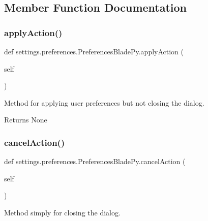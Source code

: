 \subsection{Member Function Documentation}
\hypertarget{classsettings_1_1preferences_1_1_preferences_blade_py_a8938a7b43ca7c5496a0ae7bf8d6a0c54}{}\label{classsettings_1_1preferences_1_1_preferences_blade_py_a8938a7b43ca7c5496a0ae7bf8d6a0c54} 
\subsubsection{\texorpdfstring{apply\+Action()}{applyAction()}}
{\footnotesize\ttfamily def settings.\+preferences.\+Preferences\+Blade\+Py.\+apply\+Action (\begin{DoxyParamCaption}\item[{}]{self }\end{DoxyParamCaption})}



Method for applying user preferences but not closing the dialog. 

\begin{DoxyReturn}{Returns}
None 
\end{DoxyReturn}
\hypertarget{classsettings_1_1preferences_1_1_preferences_blade_py_af92de31fcc110a9892dc2914efb6b46f}{}\label{classsettings_1_1preferences_1_1_preferences_blade_py_af92de31fcc110a9892dc2914efb6b46f} 
\subsubsection{\texorpdfstring{cancel\+Action()}{cancelAction()}}
{\footnotesize\ttfamily def settings.\+preferences.\+Preferences\+Blade\+Py.\+cancel\+Action (\begin{DoxyParamCaption}\item[{}]{self }\end{DoxyParamCaption})}



Method simply for closing the dialog. 

